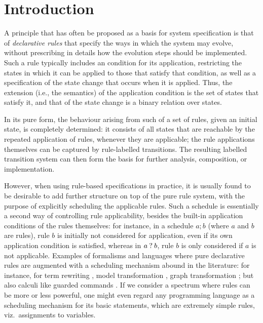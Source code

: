 \section{Introduction}
\label{sec:intro}

A principle that has often be proposed as a basis for system specification is that of \emph{declarative rules} that specify the ways in which the system may evolve, without prescribing in details how the evolution steps should be implemented. Such a rule typically includes an condition for its application, restricting the states in which it can be applied to those that satisfy that condition, as well as a specification of the state change that occurs when it is applied. Thus, the extension (i.e., the semantics) of the application condition is the set of states that satisfy it, and that of the state change is a binary relation over states.

In its pure form, the behaviour arising from such of a set of rules, given an initial state, is completely determined: it consists of all states that are reachable by the repeated application of rules, whenever they are applicable; the rule applications themselves can be captured by rule-labelled transitions. The resulting labelled transition system can then form the basis for further analysis, composition, or implementation.

However, when using rule-based specifications in practice, it is usually found to be desirable to add further structure on top of the pure rule system, with the purpose of explicitly scheduling the applicable rules. Such a schedule is essentially a second way of controlling rule applicability, besides the built-in application conditions of the rules themselves: for instance, in a schedule $a;b$ (where $a$ and $b$ are rules), rule $b$ is initially not considered for application, even if its own application condition is satisfied, whereas in $a\mathbin{?} b$, rule $b$ is only considered if $a$ is not applicable. Examples of formalisms and languages where pure declarative rules are augmented with a scheduling mechanism abound in the literature: for instance, for term rewriting \cite{Spoofax,Maude}, model transformation \cite{QVT}, graph transformation \cite{GG}; but also calculi like guarded commands \cite{GC,ChandyMisra}. If we consider a spectrum where rules can be more or less powerful, one might even regard any programming language as a scheduling mechanism for its basic statements, which are extremely simple rules, viz.\ assignments to variables.

